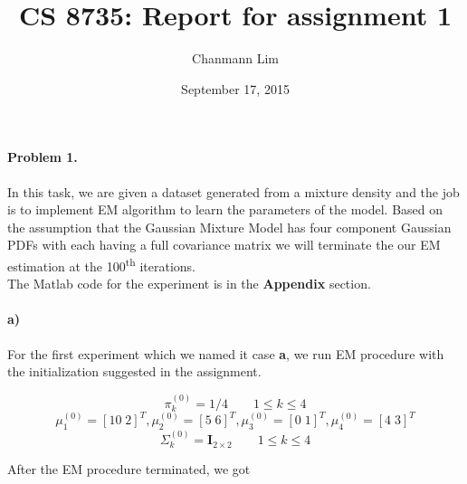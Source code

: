 \documentclass[a4paper]{article}
\begin{document}
\title{CS 8735: Report for assignment 1}
\author{Chanmann Lim}
\date{September 17, 2015}
\maketitle

\paragraph{Problem 1.} In this task, we are given a dataset generated from a mixture density and the job is to implement EM algorithm to learn the parameters of the model. Based on the assumption that the Gaussian Mixture Model has four component Gaussian PDFs with each having a full covariance matrix we will terminate the our EM estimation at the 100\textsuperscript{th} iterations. \\

\noindent The Matlab code for the experiment is in the \textbf{Appendix} section.

\paragraph{a) } For the first experiment which we named it case \textbf{a}, we run EM procedure with the initialization suggested in the assignment.

$$ \pi_k^{(0)} = 1/4 \qquad 1 \le k \le 4 $$
$$ \mu_1^{(0)} = [10\;2]^T, \mu_2^{(0)} = [5\;6]^T, \mu_3^{(0)} = [0\;1]^T, \mu_4^{(0)} = [4\;3]^T $$
$$ \Sigma_k^{(0)} = \mathbf{I}_{2\times2} \qquad 1 \le k \le 4 $$

After the EM procedure terminated, we got
\end{document}
